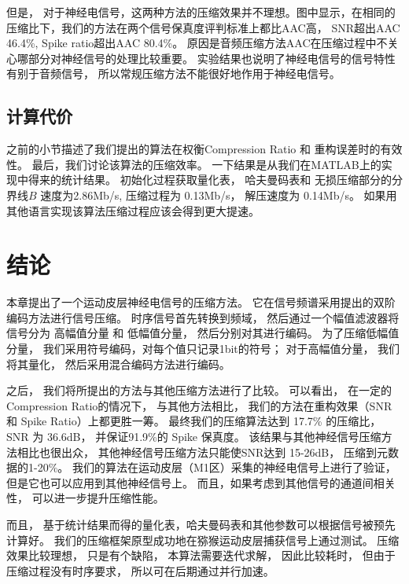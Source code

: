 但是， 对于神经电信号，这两种方法的压缩效果并不理想。图中显示，在相同的压缩比下，我们的方法在两个信号保真度评判标准上都比AAC高， SNR超出AAC 46.4\%, Spike ratio超出AAC 80.4\%。 原因是音频压缩方法AAC在压缩过程中不关心哪部分对神经信号的处理比较重要。 实验结果也说明了神经电信号的信号特性有别于音频信号， 所以常规压缩方法不能很好地作用于神经电信号。 





\subsection{计算代价}
之前的小节描述了我们提出的算法在权衡Compression Ratio 和 重构误差时的有效性。 最后，我们讨论该算法的压缩效率。 一下结果是从我们在MATLAB上的实现中得来的统计结果。 初始化过程获取量化表， 哈夫曼码表和 无损压缩部分的分界线$B$ 速度为2.86Mb/s, 压缩过程为 0.13Mb/s， 解压速度为 0.14Mb/s。 如果用其他语言实现该算法压缩过程应该会得到更大提速。 




\section{结论}
本章提出了一个运动皮层神经电信号的压缩方法。 它在信号频谱采用提出的双阶编码方法进行信号压缩。 时序信号首先转换到频域， 然后通过一个幅值滤波器将信号分为 高幅值分量 和 低幅值分量， 然后分别对其进行编码。 为了压缩低幅值分量， 我们采用符号编码，对每个值只记录1bit的符号； 对于高幅值分量， 我们将其量化， 然后采用混合编码方法进行编码。 

之后， 我们将所提出的方法与其他压缩方法进行了比较。 可以看出， 在一定的Compression Ratio的情况下， 与其他方法相比， 我们的方法在重构效果（SNR 和 Spike Ratio）上都更胜一筹。 最终我们的压缩算法达到 17.7\% 的压缩比， SNR 为 36.6dB， 并保证91.9\%的 Spike 保真度。 该结果与其他神经信号压缩方法相比也很出众， 其他神经信号压缩方法只能使SNR达到 15-26dB， 压缩到元数据的1-20\%\cite{15,16,25}。 我们的算法在运动皮层（M1区）采集的神经电信号上进行了验证， 但是它也可以应用到其他神经信号上。 而且，如果考虑到其他信号的通道间相关性， 可以进一步提升压缩性能。 

而且， 基于统计结果而得的量化表，哈夫曼码表和其他参数可以根据信号被预先计算好。 我们的压缩框架原型成功地在猕猴运动皮层捕获信号上通过测试。 压缩效果比较理想， 只是有个缺陷， 本算法需要迭代求解， 因此比较耗时， 但由于压缩过程没有时序要求， 所以可在后期通过并行加速。












